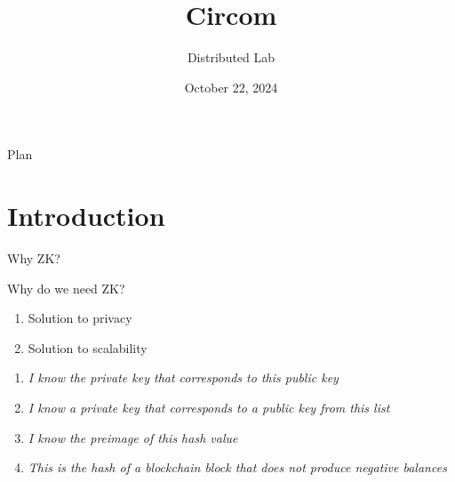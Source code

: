 \documentclass{zkdl-presentation-template}
\title[Circom]{\textbf{Circom}}
\author{Distributed Lab}
\date{October 22, 2024}
\begin{document}

    \begin{frame}{Plan}
        \tableofcontents
    \end{frame}


    \section{Introduction}

    \begin{frame}{Why ZK?}
        \pause

        \begin{block}{Why do we need ZK?}
            \begin{enumerate}
                \item Solution to privacy
                \item Solution to scalability
            \end{enumerate}
        \end{block}

        \pause

        \begin{example}
            \begin{enumerate}
                \item \textit{I know the private key that corresponds to this public key}
                \item \textit{I know a private key that corresponds to a public key from this list}
                \item \textit{I know the preimage of this hash value}
                \item \textit{This is the hash of a blockchain block that does not produce negative balances}
            \end{enumerate}
        \end{example}
    \end{frame}
\end{document}
